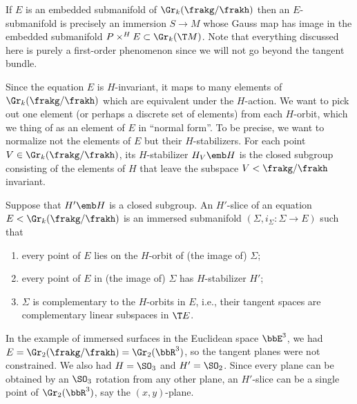 If $E$ is an embedded submanifold of $\Gr_k(\frakg\slash\frakh)$ then an $E$-submanifold is precisely an immersion $S\to M$ whose Gauss map has image in the embedded submanifold $P\times^H E\subset \Gr_k(\T M)$. Note that everything discussed here is purely a first-order phenomenon since we will not go beyond the tangent bundle.

Since the equation $E$ is $H$-invariant, it maps to many elements of $\Gr_k(\frakg\slash\frakh)$ which are equivalent under the $H$-action. We want to pick out one element (or perhaps a discrete set of elements) from each $H$-orbit, which we thing of as an element of $E$ in ``normal form''. To be precise, we want to normalize not the elements of $E$ but their $H$-stabilizers. For each point $V\in\Gr_k(\frakg\slash\frakh)$, its $H$-stabilizer $H_V\emb H$ is the closed subgroup consisting of the elements of $H$ that leave the subspace $V<\frakg\slash\frakh$ invariant. 

\begin{defn}[$H'$-slice]
    Suppose that $H'\emb H$ is a closed subgroup. An $H'$-slice of an equation $E<\Gr_k(\frakg\slash\frakh)$ is an immersed submanifold $(\varSigma,i_\varSigma:\varSigma\to E)$ such that 
    \begin{enumerate}
        \item every point of $E$ lies on the $H$-orbit of (the image of) $\varSigma$;
        \item every point of $E$ in (the image of) $\varSigma$ has $H$-stabilizer $H'$;
        \item $\varSigma$ is complementary to the $H$-orbits in $E$, i.e., their tangent spaces are complementary linear subspaces in $\T E$.
    \end{enumerate}
\end{defn}

\begin{example}
    In the example of immersed surfaces in the Euclidean space $\bbE^3$, we had $E=\Gr_2(\frakg\slash\frakh)=\Gr_2(\bbR^3)$, so the tangent planes were not constrained. We also had $H=\SO_3$ and $H'=\SO_2$. Since every plane can be obtained by an $\SO_3$ rotation from any other plane, an $H'$-slice can be a single point of $\Gr_2(\bbR^3)$, say the $(x,y)$-plane. 
\end{example}

